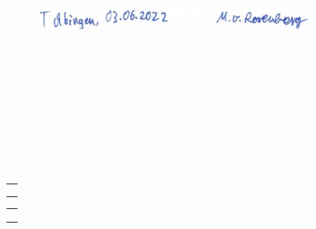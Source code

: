 \begin{figure}[h]
    \centering
    \includegraphics[width=0.8\textwidth,height=10cm,keepaspectratio=true]{content/images/unterschrift.jpg}
\end{figure}
\vspace{-0.4cm}
\begin{minipage}{0.99\textwidth}
	\centering
	\begin{minipage}[t]{0.5\textwidth}
	\hspace{1cm}
		\begin{tabular}{@{}l@{}}\hline
			\makebox[7cm]{Ort, Datum}\\
			\\
			\\
		\end{tabular}
	\end{minipage}
	\hfill
	\begin{minipage}[t]{0.4\textwidth}
		\begin{tabular}{@{}l@{}}\hline
			\makebox[5cm]{Unterschrift}\\
			\\
			\\
		\end{tabular}
	\end{minipage}
\end{minipage}
